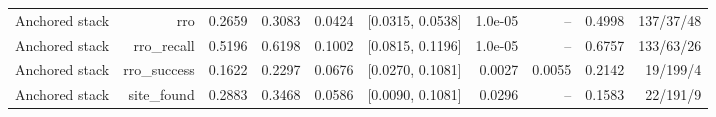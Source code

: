 \begin{table}[t]
\begin{tabular}{lrrrrrrrrr}
Anchored stack & rro & 0.2659 & 0.3083 & 0.0424 & [0.0315, 0.0538] & 1.0e-05 & -- & 0.4998 & 137/37/48 \\
Anchored stack & rro\_recall & 0.5196 & 0.6198 & 0.1002 & [0.0815, 0.1196] & 1.0e-05 & -- & 0.6757 & 133/63/26 \\
Anchored stack & rro\_success & 0.1622 & 0.2297 & 0.0676 & [0.0270, 0.1081] & 0.0027 & 0.0055 & 0.2142 & 19/199/4 \\
Anchored stack & site\_found & 0.2883 & 0.3468 & 0.0586 & [0.0090, 0.1081] & 0.0296 & -- & 0.1583 & 22/191/9 \\
\bottomrule
\end{tabular}
\end{table}
